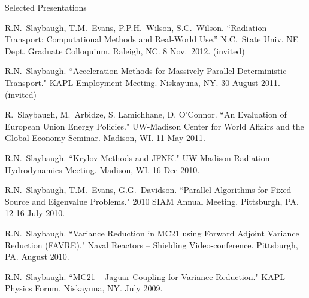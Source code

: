 \documentclass{resume2} %
\begin{document}
\begin{rSection}{Selected Presentations}

\begin{bibsection}
\item R.N.\ Slaybaugh, T.M.\ Evans, P.P.H.\ Wilson, S.C.\ Wilson. ``Radiation Transport: Computational Methods and Real-World Use.'' N.C.\ State Univ. NE Dept. Graduate Colloquium. Raleigh, NC. 8 Nov.\ 2012. (invited)

\item R.N.\ Slaybaugh. ``Acceleration Methods for Massively Parallel Deterministic Transport." KAPL Employment Meeting. Niskayuna, NY. 30 August 2011. (invited)

\item R.\ Slaybaugh, M.\ Arbidze, S. Lamichhane, D. O’Connor. ``An Evaluation of European Union Energy Policies." UW-Madison Center for World Affairs and the Global Economy Seminar. Madison, WI. 11 May 2011.

\item R.N.\ Slaybaugh. ``Krylov Methods and JFNK." UW-Madison Radiation Hydrodynamics Meeting. Madison, WI. 16 Dec 2010.

\item R.N.\ Slaybaugh, T.M.\ Evans, G.G.\ Davidson. ``Parallel Algorithms for Fixed-Source and Eigenvalue Problems." 2010 SIAM Annual Meeting. Pittsburgh, PA. 12-16 July 2010.

\item R.N.\ Slaybaugh. ``Variance Reduction in MC21 using Forward Adjoint Variance Reduction (FAVRE)." Naval Reactors – Shielding Video-conference. Pittsburgh, PA. August 2010.

\item R.N.\ Slaybaugh. ``MC21 – Jaguar Coupling for Variance Reduction." KAPL Physics Forum. Niskayuna, NY. July 2009.

\end{bibsection}

\end{rSection}

\end{document}
